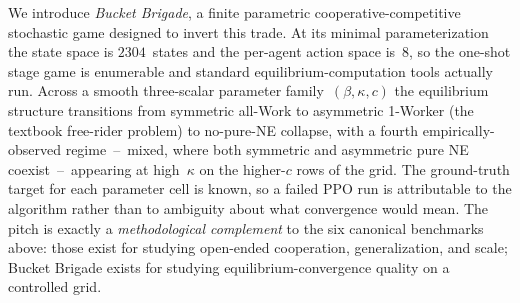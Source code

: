 \documentclass{anvil-paper}
\begin{document}
We introduce \emph{Bucket Brigade}, a finite parametric cooperative-competitive
stochastic game designed to invert this trade. At its minimal parameterization
the state space is $2304$~states and the per-agent action space is~$8$, so the
one-shot stage game is enumerable and standard equilibrium-computation tools
actually run. Across a smooth three-scalar parameter family~$(\beta,\kappa,c)$
the equilibrium structure transitions from symmetric all-Work to asymmetric
1-Worker (the textbook free-rider problem) to no-pure-NE collapse, with a
fourth empirically-observed regime~--~\textsf{mixed}, where both symmetric
and asymmetric pure NE coexist~--~appearing at high~$\kappa$ on the
higher-$c$ rows of the grid. The ground-truth target for each parameter cell
is known, so a failed PPO run is attributable to the algorithm rather than
to ambiguity about what convergence would mean. The pitch is exactly a
\emph{methodological complement} to the six canonical benchmarks above: those
exist for studying open-ended cooperation, generalization, and scale; Bucket
Brigade exists for studying equilibrium-convergence quality on a controlled
grid.
\end{document}
